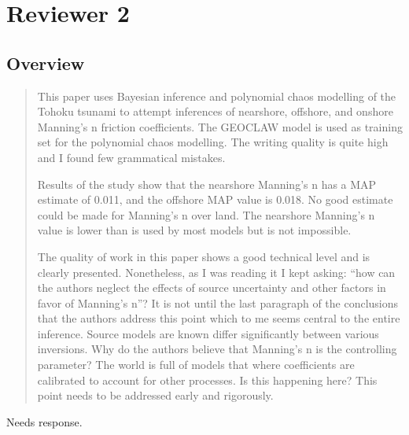 \documentclass[]{article}
\newcommand{\alert}[1]{{\color{red} #1}}
\begin{document}
\section*{Reviewer 2}
\subsection*{Overview}
\begin{quote}      
This paper uses Bayesian inference and polynomial chaos modelling of the Tohoku tsunami to attempt inferences of nearshore, offshore, and onshore Manning's n friction coefficients. The GEOCLAW model is used as training set for the polynomial chaos modelling. The writing quality is quite high and I found few grammatical mistakes.

Results of the study show that the nearshore Manning's n has a MAP estimate of 0.011, and the offshore MAP value is 0.018. No good estimate could be made for Manning's n over land. The nearshore Manning's n value is lower than is used by most models but is not impossible.

The quality of work in this paper shows a good technical level and is clearly presented. Nonetheless, as I was reading it I kept asking: ``how can the authors neglect the effects of source uncertainty and other factors in favor of Manning's n''? It is not until the last paragraph of the conclusions that the authors address this point which to me seems central to the entire inference. Source models are known differ significantly between various inversions. Why do the authors believe that Manning's n is the controlling parameter? The world is full of models that where coefficients are calibrated to account for other processes. Is this happening here? This point needs to be addressed early and rigorously.
\end{quote}

\alert{Needs response.} \\
\end{document}
